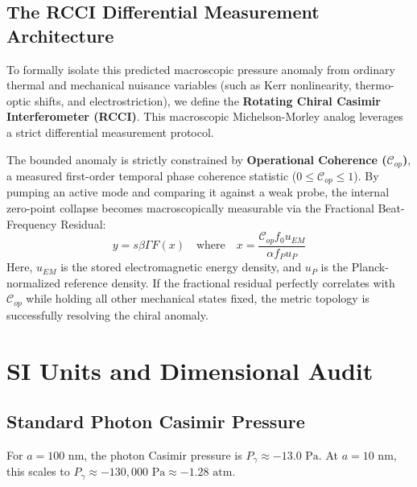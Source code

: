 \subsection{The RCCI Differential Measurement Architecture}\label{sec:rcci}

To formally isolate this predicted macroscopic pressure anomaly from ordinary thermal and mechanical nuisance variables (such as Kerr nonlinearity, thermo-optic shifts, and electrostriction), we define the \textbf{Rotating Chiral Casimir Interferometer (RCCI)}. This macroscopic Michelson-Morley analog leverages a strict differential measurement protocol.

The bounded anomaly is strictly constrained by \textbf{Operational Coherence ($\mathcal{C}_{op}$)}, a measured first-order temporal phase coherence statistic ($0 \le \mathcal{C}_{op} \le 1$). By pumping an active mode and comparing it against a weak probe, the internal zero-point collapse becomes macroscopically measurable via the Fractional Beat-Frequency Residual:
\begin{equation}
    y = s \beta \Gamma F(x) \quad \text{where} \quad x = \frac{\mathcal{C}_{op} f_0 u_{EM}}{\alpha f_P u_P}
\end{equation}
Here, $u_{EM}$ is the stored electromagnetic energy density, and $u_P$ is the Planck-normalized reference density. If the fractional residual perfectly correlates with $\mathcal{C}_{op}$ while holding all other mechanical states fixed, the metric topology is successfully resolving the chiral anomaly.

\section{SI Units and Dimensional Audit}\label{sec:units}

\subsection{Standard Photon Casimir Pressure}\label{sec:photon}
For $a = 100 \text{ nm}$, the photon Casimir pressure is $P_\gamma \approx -13.0 \text{ Pa}$. At $a = 10 \text{ nm}$, this scales to $P_\gamma \approx -130,000 \text{ Pa} \approx -1.28 \text{ atm}$.


